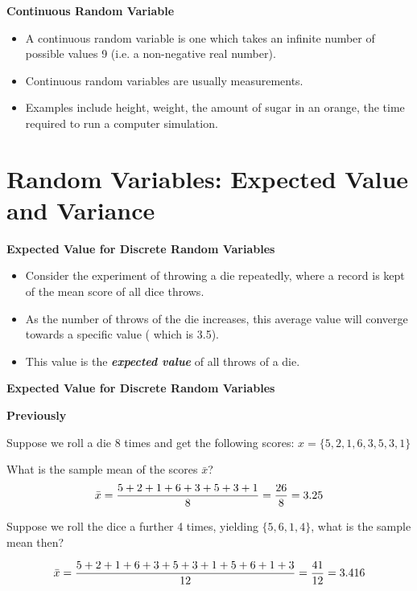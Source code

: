 \documentclass[00-IntroStatsMaster.tex]{subfiles}
\begin{document}
{
	\textbf{Continuous Random Variable}
	\begin{itemize} \item
		A continuous random variable is one which takes an infinite number of possible values 9 (i.e. a non-negative real number). \item Continuous random variables are usually measurements. \item Examples include height, weight, the amount of sugar in an orange, the time required to run a computer simulation. \end{itemize}
	
}

\section{Random Variables: Expected Value and Variance}

{
	
	\textbf{Expected Value for Discrete Random Variables}
	
	\begin{itemize}
		
		\item Consider the experiment of throwing a die repeatedly, where a record is kept of the mean score of all dice throws.
		\item As the number of throws of the die increases, this average value will converge towards a specific value ( which is 3.5).
		\item This value is the \textbf{\emph{expected value}} of all throws of a die.
	\end{itemize}
}
{
	\textbf{Expected Value for Discrete Random Variables}
	
	\textbf{Previously}
	
	Suppose we roll a die 8 times and get the following scores: $x = \{ 5, 2, 1, 6, 3, 5, 3, 1\}$ \\ \bigskip
	
	What is the sample mean of the scores $\bar{x}$?
	\[ \bar{x}  = {5 + 2 +  1 +  6 +  3 +  5 +  3 +  1 \over 8 } = {26 \over 8} =  3.25 \]
	
	Suppose we roll the dice a further 4 times, yielding $\{ 5, 6, 1, 4 \}$, what is the sample mean then?
	
	\[ \bar{x}  = {5 + 2 +  1 +  6 +  3 +  5 +  3 +  1  + 5 + 6 + 1 + 3 \over 12 } = {41 \over 12} =  3.416 \]
}
\end{document}
